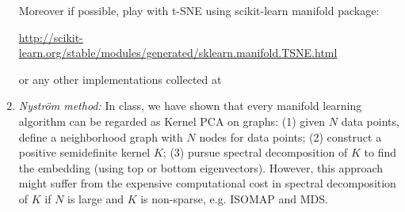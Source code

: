 \documentclass[11pt]{article}
\def\R{{\mathbb R}}
\begin{document}
\begin{enumerate}
\subitem *Moreover if possible, play with t-SNE using scikit-learn manifold package:

\url{http://scikit-learn.org/stable/modules/generated/sklearn.manifold.TSNE.html}

or any other implementations collected at 


%


\item {\em Nystr\"{o}m method:} In class, we have shown that every manifold learning algorithm can be regarded as Kernel PCA on graphs: (1) given $N$ data points, define a neighborhood graph with $N$ nodes for data points; (2) construct a positive semidefinite kernel $K$; (3) pursue spectral decomposition of $K$ to find the embedding (using top or bottom eigenvectors). However, this approach might suffer from the expensive computational cost in spectral decomposition of $K$ if $N$ is large and $K$ is non-sparse, e.g. ISOMAP and MDS. 


\end{enumerate}
\end{document}

